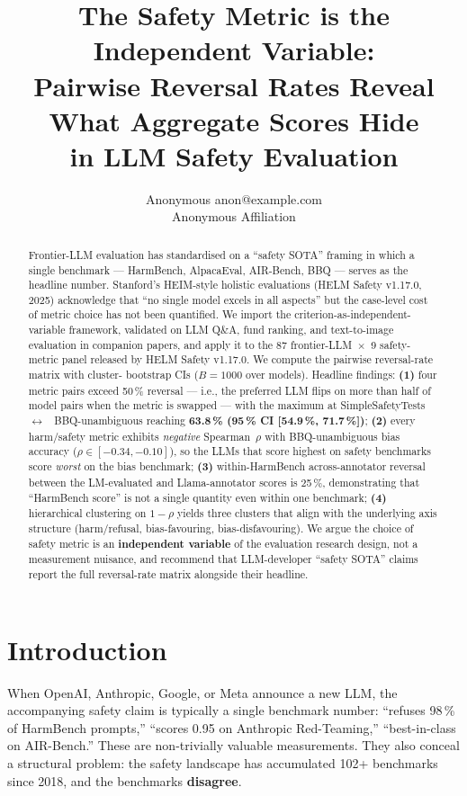 \documentclass[10pt]{article}
\title{The Safety Metric is the Independent Variable:\\
Pairwise Reversal Rates Reveal What Aggregate Scores Hide\\
in LLM Safety Evaluation}
\author{\name Anonymous \email anon@example.com \\
       \addr Anonymous Affiliation}
\begin{document}
\maketitle

\begin{abstract}
Frontier-LLM evaluation has standardised on a ``safety SOTA'' framing
in which a single benchmark --- HarmBench, AlpacaEval, AIR-Bench, BBQ
--- serves as the headline number. Stanford's HEIM-style holistic
evaluations (HELM Safety v1.17.0, 2025) acknowledge that ``no single
model excels in all aspects'' but the case-level cost of metric choice
has not been quantified. We import the criterion-as-independent-
variable framework, validated on LLM Q\&A, fund ranking, and
text-to-image evaluation in companion papers, and apply it to the 87
frontier-LLM~$\times$~9 safety-metric panel released by HELM Safety
v1.17.0. We compute the pairwise reversal-rate matrix with cluster-
bootstrap CIs ($B = 1000$ over models). Headline findings:
\textbf{(1)} four metric pairs exceed 50\,\% reversal --- i.e., the
preferred LLM flips on more than half of model pairs when the metric
is swapped --- with the maximum at SimpleSafetyTests~$\leftrightarrow$~
BBQ-unambiguous reaching \textbf{63.8\,\% (95\,\% CI [54.9\,\%,
71.7\,\%])}; \textbf{(2)} every harm/safety metric exhibits
\emph{negative} Spearman~$\rho$ with BBQ-unambiguous bias accuracy
($\rho \in [-0.34, -0.10]$), so the LLMs that score highest on safety
benchmarks score \emph{worst} on the bias benchmark; \textbf{(3)}
within-HarmBench across-annotator reversal between the LM-evaluated
and Llama-annotator scores is 25\,\%, demonstrating that ``HarmBench
score'' is not a single quantity even within one benchmark;
\textbf{(4)} hierarchical clustering on $1 - \rho$ yields three
clusters that align with the underlying axis structure (harm/refusal,
bias-favouring, bias-disfavouring). We argue the choice of safety
metric is an \textbf{independent variable} of the evaluation research
design, not a measurement nuisance, and recommend that
LLM-developer ``safety SOTA'' claims report the full reversal-rate
matrix alongside their headline.
\end{abstract}

\section{Introduction}

When OpenAI, Anthropic, Google, or Meta announce a new LLM, the
accompanying safety claim is typically a single benchmark number:
``refuses 98\,\% of HarmBench prompts,'' ``scores 0.95 on Anthropic
Red-Teaming,'' ``best-in-class on AIR-Bench.'' These are non-trivially
valuable measurements. They also conceal a structural problem: the
safety landscape has accumulated 102+ benchmarks since 2018, and the
benchmarks \textbf{disagree}.
\end{document}
